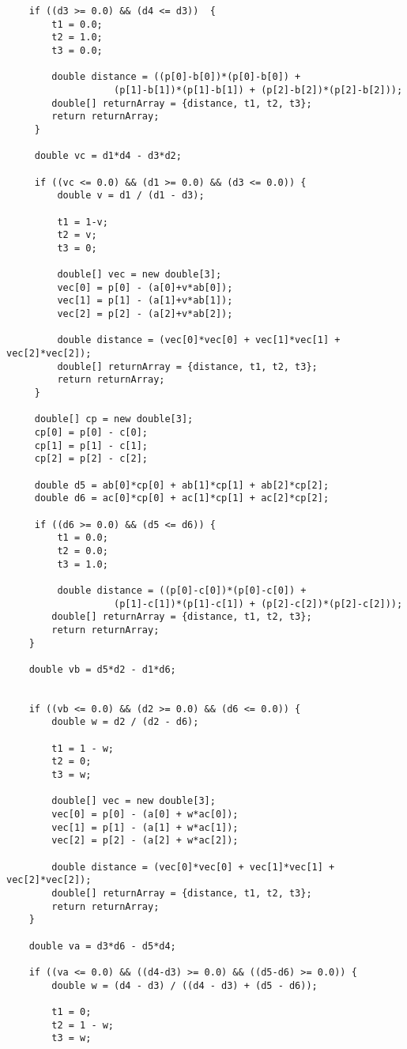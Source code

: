 \begin{lstlisting}
	if ((d3 >= 0.0) && (d4 <= d3))	{
	    t1 = 0.0;
	    t2 = 1.0;
	    t3 = 0.0;
	    
	    double distance = ((p[0]-b[0])*(p[0]-b[0]) +
			       (p[1]-b[1])*(p[1]-b[1]) + (p[2]-b[2])*(p[2]-b[2]));
	    double[] returnArray = {distance, t1, t2, t3};
	    return returnArray;
	 }

	 double vc = d1*d4 - d3*d2;

	 if ((vc <= 0.0) && (d1 >= 0.0) && (d3 <= 0.0)) {
	     double v = d1 / (d1 - d3);

	     t1 = 1-v;
	     t2 = v;
	     t3 = 0;

	     double[] vec = new double[3];
	     vec[0] = p[0] - (a[0]+v*ab[0]);
	     vec[1] = p[1] - (a[1]+v*ab[1]);
	     vec[2] = p[2] - (a[2]+v*ab[2]);

	     double distance = (vec[0]*vec[0] + vec[1]*vec[1] + vec[2]*vec[2]);
	     double[] returnArray = {distance, t1, t2, t3};
	     return returnArray;
	 }

	 double[] cp = new double[3];
	 cp[0] = p[0] - c[0];
	 cp[1] = p[1] - c[1];
	 cp[2] = p[2] - c[2];

	 double d5 = ab[0]*cp[0] + ab[1]*cp[1] + ab[2]*cp[2];
	 double d6 = ac[0]*cp[0] + ac[1]*cp[1] + ac[2]*cp[2];

	 if ((d6 >= 0.0) && (d5 <= d6))	{
	     t1 = 0.0;
	     t2 = 0.0;
	     t3 = 1.0;

	     double distance = ((p[0]-c[0])*(p[0]-c[0]) +
			       (p[1]-c[1])*(p[1]-c[1]) + (p[2]-c[2])*(p[2]-c[2]));
	    double[] returnArray = {distance, t1, t2, t3};
	    return returnArray;
	}

	double vb = d5*d2 - d1*d6;


	if ((vb <= 0.0) && (d2 >= 0.0) && (d6 <= 0.0)) {
	    double w = d2 / (d2 - d6);
	    
	    t1 = 1 - w;
	    t2 = 0;
	    t3 = w;
	    
	    double[] vec = new double[3];
	    vec[0] = p[0] - (a[0] + w*ac[0]);
	    vec[1] = p[1] - (a[1] + w*ac[1]);
	    vec[2] = p[2] - (a[2] + w*ac[2]);
	    
	    double distance = (vec[0]*vec[0] + vec[1]*vec[1] + vec[2]*vec[2]);
	    double[] returnArray = {distance, t1, t2, t3};
	    return returnArray;
	}
	
	double va = d3*d6 - d5*d4;

	if ((va <= 0.0) && ((d4-d3) >= 0.0) && ((d5-d6) >= 0.0)) {
	    double w = (d4 - d3) / ((d4 - d3) + (d5 - d6));
	    
	    t1 = 0;
	    t2 = 1 - w;
	    t3 = w;
	    

\end{lstlisting}
